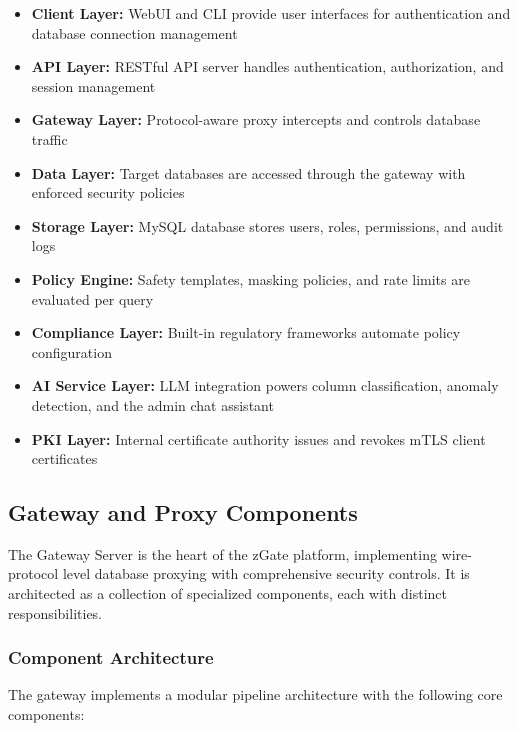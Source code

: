 \begin{itemize}[leftmargin=*]
    \item \textbf{Client Layer:} WebUI and CLI provide user interfaces for authentication and database connection management
    \item \textbf{API Layer:} RESTful API server handles authentication, authorization, and session management
    \item \textbf{Gateway Layer:} Protocol-aware proxy intercepts and controls database traffic
    \item \textbf{Data Layer:} Target databases are accessed through the gateway with enforced security policies
    \item \textbf{Storage Layer:} MySQL database stores users, roles, permissions, and audit logs
    \item \textbf{Policy Engine:} Safety templates, masking policies, and rate limits are evaluated per query
    \item \textbf{Compliance Layer:} Built-in regulatory frameworks automate policy configuration
    \item \textbf{AI Service Layer:} LLM integration powers column classification, anomaly detection, and the admin chat assistant
    \item \textbf{PKI Layer:} Internal certificate authority issues and revokes mTLS client certificates
\end{itemize}

\subsection{Gateway and Proxy Components}

The Gateway Server is the heart of the zGate platform, implementing wire-protocol level database proxying with comprehensive security controls. It is architected as a collection of specialized components, each with distinct responsibilities.

\subsubsection{Component Architecture}

The gateway implements a modular pipeline architecture with the following core components:

